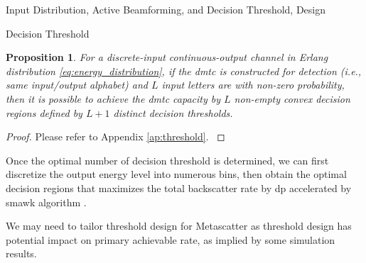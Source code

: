 \documentclass[journal]{IEEEtran}
\newtheorem{proposition}{Proposition}
\begin{document}
\begin{section}{Input Distribution, Active Beamforming, and Decision Threshold, Design}
\begin{subsection}{Decision Threshold}
		\begin{proposition}
			For a discrete-input continuous-output channel in Erlang distribution \eqref{eq:energy_distribution}, if the \gls{dmtc} is constructed for detection (i.e., same input/output alphabet) and $L$ input letters are with non-zero probability, then it is possible to achieve the \gls{dmtc} capacity by $L$ non-empty convex decision regions defined by $L+1$ distinct decision thresholds.
			\label{pr:threshold}
		\end{proposition}

		\begin{proof}
			Please refer to Appendix \ref{ap:threshold}.
			\label{pf:threshold}
		\end{proof}

		Once the optimal number of decision threshold is determined, we can first discretize the output energy level into numerous bins, then obtain the optimal decision regions that maximizes the total backscatter rate by \gls{dp} accelerated by \gls{smawk} algorithm \cite{He2021}.

		\begin{tcolorbox}
			We may need to tailor threshold design for Metascatter as threshold design has potential impact on primary achievable rate, as implied by some simulation results.
		\end{tcolorbox}
	\end{subsection}
\end{section}
\end{document}
